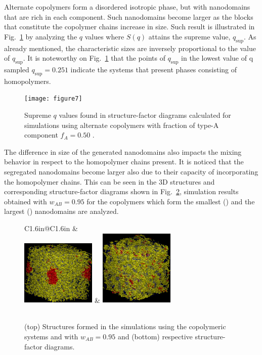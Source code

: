 \documentclass[
journal=mamobx,
manuscript=article,
]{achemso}
\begin{document}
Alternate copolymers form a disordered isotropic phase, but with nanodomains that are rich in each component.
Such nanodomains become larger as the blocks that constitute the copolymer chains increase in size.
Such result is illustrated in Fig.~\ref{fig:Figure_7} by analyzing the $q$ values where $S(q)$ attains the supreme value, $q_\mathrm{sup}$.
As already mentioned, the characteristic sizes are inversely proportional to the value of $q_\mathrm{sup}$.
It is noteworthy on Fig.~\ref{fig:Figure_7} that the points of $q_\mathrm{sup}$ in the lowest value of q sampled $q_\mathrm{sup} = 0.251$ indicate the systems that present phases consisting of homopolymers.

\begin{figure}
	\centering
	\texttt{[image: figure7]}
	\caption{Supreme $q$ values found in structure-factor diagrams calculated for simulations using alternate copolymers with fraction of type-A component $f_A=0.50$ .}
	\label{fig:Figure_7}
\end{figure}

The difference in size of the generated nanodomains also impacts the mixing behavior in respect to the homopolymer chains present.
It is noticed that the segregated nanodomains become larger also due to their capacity of incorporating the homopolymer chains.
This can be seen in the 3D structures and corresponding structure-factor diagrams shown in Fig.~\ref{fig:Figure_8}, simulation results obtained with $w_{AB}=0.95$ for the copolymers which form the smallest () and the largest () nanodomains are analyzed.

\begin{figure}
	\centering
	\begin{tabular}{C{1.6in}@{}C{1.6in}}
		 \textcolor{white}{ } & \textcolor{white}{ } \\
		 \includegraphics[width=1.4in]{alt1_095} & \includegraphics[width=1.4in]{A3B2A2B3_095} \\
		 \\
	\end{tabular}
	\caption{(top) Structures formed in the simulations using the copolymeric systems  and  with $w_{AB}=0.95$ and (bottom) respective structure-factor diagrams.}
	\label{fig:Figure_8}
\end{figure}
\end{document}
